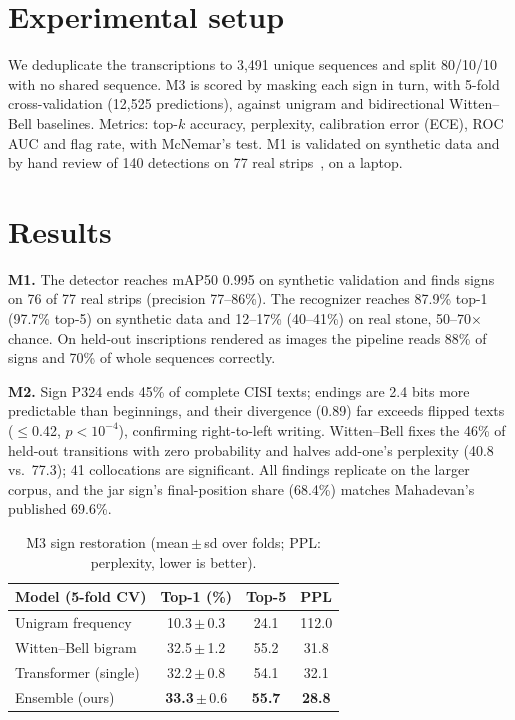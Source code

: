\documentclass[11pt,a4paper,twocolumn]{article}
\begin{document}
\section{Experimental setup}
We deduplicate the transcriptions to 3,491 unique sequences and split 80/10/10 with no shared sequence.
M3 is scored by masking each sign in turn, with 5-fold cross-validation (12,525 predictions), against
unigram and bidirectional Witten--Bell baselines. Metrics: top-$k$ accuracy, perplexity, calibration
error (ECE), ROC AUC and flag rate, with McNemar's test. M1 is validated on
synthetic data and by hand review of 140 detections on 77 real strips~\cite{isd}, on a laptop.

\section{Results}
\textbf{M1.} The detector reaches mAP50 0.995 on synthetic validation and finds signs on 76 of 77 real
strips (precision 77--86\%). The recognizer reaches 87.9\% top-1 (97.7\% top-5) on synthetic data and
12--17\% (40--41\%) on real stone, 50--70$\times$ chance. On held-out inscriptions rendered as images the
pipeline reads 88\% of signs and 70\% of whole sequences correctly.

\textbf{M2.} Sign P324 ends 45\% of complete CISI texts; endings are 2.4 bits more predictable than
beginnings, and their divergence (0.89) far exceeds flipped texts ($\le$0.42, $p<10^{-4}$), confirming
right-to-left writing. Witten--Bell fixes the 46\% of held-out transitions with zero
probability and halves add-one's perplexity (40.8 vs.\ 77.3); 41 collocations are significant. All
findings replicate on the larger corpus, and the jar sign's final-position share (68.4\%) matches
Mahadevan's published 69.6\%.

\begin{table}[h]
\centering
\small
\begin{tabular}{lccc}
\toprule
Model (5-fold CV) & Top-1 (\%) & Top-5 & PPL \\
\midrule
Unigram frequency & 10.3\,$\pm$\,0.3 & 24.1 & 112.0 \\
Witten--Bell bigram & 32.5\,$\pm$\,1.2 & 55.2 & 31.8 \\
Transformer (single) & 32.2\,$\pm$\,0.8 & 54.1 & 32.1 \\
Ensemble (ours) & \textbf{33.3}\,$\pm$\,0.6 & \textbf{55.7} & \textbf{28.8} \\
\bottomrule
\end{tabular}
\caption{M3 sign restoration (mean\,$\pm$\,sd over folds; PPL: perplexity, lower is better).}
\label{tab:m3}
\end{table}
\end{document}
